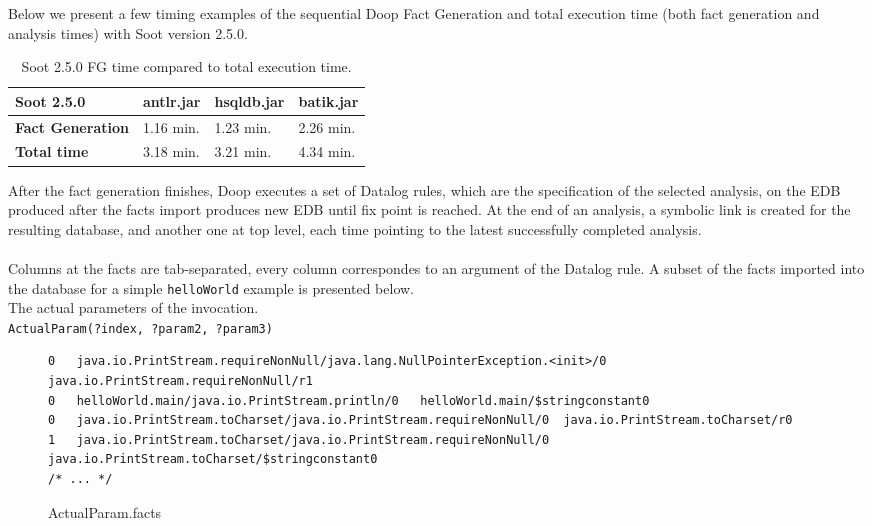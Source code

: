\documentclass{dithesis}
\begin{document}
        Below we present a few timing examples of the sequential Doop Fact Generation and total execution time (both fact generation and analysis times) with Soot version 2.5.0.
        \begin{table}[H]
            \centering
                \begin{tabular}{llll}
                \hline
                \textbf{Soot 2.5.0}      & \textbf{antlr.jar} & \textbf{hsqldb.jar} & \textbf{batik.jar} \\ \hline
                \textbf{Fact Generation} & 1.16 min.          & 1.23 min.           & 2.26 min.          \\
                \textbf{Total time}      & 3.18 min.          & 3.21 min.           & 4.34 min.          \\ \hline
                \end{tabular}
                \newline
            \caption[Soot 2.5.0 FG times]{Soot 2.5.0 FG time compared to total execution time.}
        \end{table}

    	After the fact generation finishes, Doop executes a set of Datalog rules, which are the specification of the selected analysis, on the EDB produced after the facts import produces new EDB until fix point is reached. At the end of an analysis, a symbolic link is created for the resulting database, and another one at top level, each time pointing to the latest successfully completed analysis. \\
        \\
        Columns at the facts are tab-separated, every column correspondes to an argument of the Datalog rule. 
        A subset of the facts imported into the database for a simple \texttt{helloWorld} example is presented below.\\
        
        The actual parameters of the invocation.\\
        \texttt{ActualParam(?index, ?param2, ?param3)}
    	\begin{figure}[H]
\begin{lstlisting}
0   java.io.PrintStream.requireNonNull/java.lang.NullPointerException.<init>/0  java.io.PrintStream.requireNonNull/r1
0   helloWorld.main/java.io.PrintStream.println/0   helloWorld.main/$stringconstant0
0   java.io.PrintStream.toCharset/java.io.PrintStream.requireNonNull/0  java.io.PrintStream.toCharset/r0
1   java.io.PrintStream.toCharset/java.io.PrintStream.requireNonNull/0  java.io.PrintStream.toCharset/$stringconstant0
/* ... */
\end{lstlisting}
\caption{ActualParam.facts}
        \end{figure}
\end{document}

